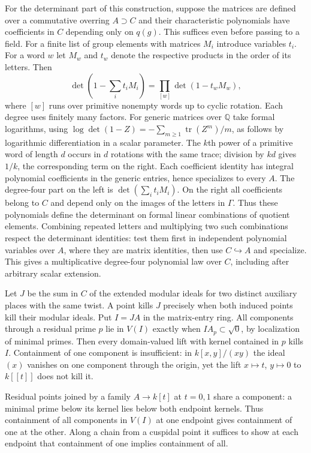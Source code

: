 \documentclass[11pt]{amsart}
\theoremstyle{definition}
\theoremstyle{remark}
\begin{document}
For the determinant part of this construction, suppose the matrices
are defined over a commutative overring $A\supset C$ and their
characteristic polynomials have coefficients in $C$ depending only
on $q(g)$. This suffices even before passing to a field. For a
finite list of group elements with matrices $M_i$ introduce variables
$t_i$. For a word $w$ let $M_w$ and $t_w$ denote the respective
products in the order of its letters. Then
\[
 \det(1-\textstyle\sum_i t_iM_i)
 =\prod_{[w]}\det(1-t_w M_w),
\]
where $[w]$ runs over primitive nonempty words up to cyclic rotation.
Each degree uses finitely many factors. For generic matrices over
$\mathbb Q$ take formal logarithms, using
$\log\det(1-Z)=-\sum_{m\ge1}\operatorname{tr}(Z^m)/m$,
as follows by logarithmic differentiation in a scalar parameter.
The $k$th power of a primitive word of length $d$ occurs in $d$
rotations with the same trace; division by $kd$ gives $1/k$,
the corresponding term on the right. Each coefficient identity
has integral polynomial coefficients in the generic entries, hence
specializes to every $A$. The degree-four part on the left is
$\det(\sum_i t_iM_i)$. On the right all coefficients belong to
$C$ and depend only on the images of the letters in $\Gamma$.
Thus these polynomials define the determinant on formal linear
combinations of quotient elements. Combining repeated letters and
multiplying two such combinations respect the determinant identities:
test them first in independent polynomial variables over $A$, where
they are matrix identities, then use $C\hookrightarrow A$ and
specialize. This gives a multiplicative degree-four polynomial law
over $C$, including after arbitrary scalar extension.

Let $J$ be the sum in $C$ of the extended modular ideals for two
distinct auxiliary places with the same twist. A point kills $J$
precisely when both induced points kill their modular ideals.
Put $I=JA$ in the matrix-entry ring. All components through a
residual prime $p$ lie in $V(I)$ exactly when $IA_p\subset\sqrt{0}$,
by localization of minimal primes. Then every domain-valued lift
with kernel contained in $p$ kills $I$. Containment of one component
is insufficient: in $k[x,y]/(xy)$ the ideal $(x)$ vanishes on one
component through the origin, yet the lift $x\mapsto t$, $y\mapsto0$
to $k[[t]]$ does not kill it.

Residual points joined by a family $A\to k[t]$ at $t=0,1$ share
a component: a minimal prime below its kernel lies below both
endpoint kernels. Thus containment of all components in $V(I)$ at
one endpoint gives containment of one at the other. Along a chain
from a cuspidal point it suffices to show at each endpoint that
containment of one implies containment of all.
\end{document}
